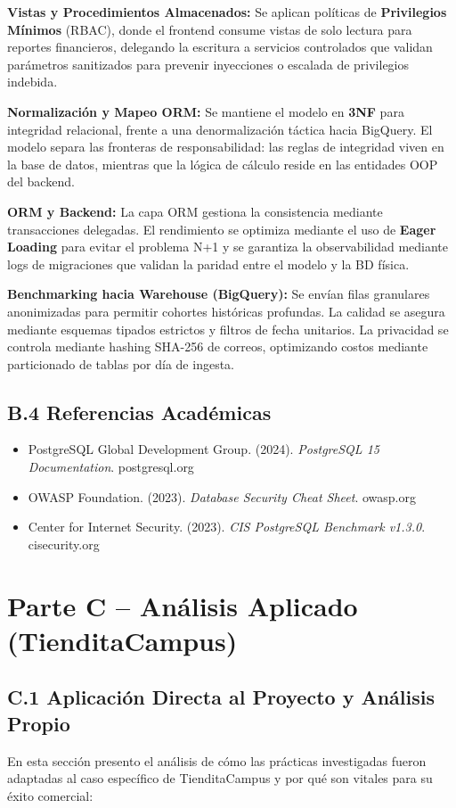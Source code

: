 \documentclass[11pt,a4paper]{article}
\begin{document}
\textbf{Vistas y Procedimientos Almacenados:} 
Se aplican políticas de \textbf{Privilegios Mínimos} (RBAC), donde el frontend consume vistas de solo lectura para reportes financieros, delegando la escritura a servicios controlados que validan parámetros sanitizados para prevenir inyecciones o escalada de privilegios indebida.

\textbf{Normalización y Mapeo ORM:} 
Se mantiene el modelo en \textbf{3NF} para integridad relacional, frente a una denormalización táctica hacia BigQuery. El modelo separa las fronteras de responsabilidad: las reglas de integridad viven en la base de datos, mientras que la lógica de cálculo reside en las entidades OOP del backend.

\textbf{ORM y Backend:} 
La capa ORM gestiona la consistencia mediante transacciones delegadas. El rendimiento se optimiza mediante el uso de \textbf{Eager Loading} para evitar el problema N+1 y se garantiza la observabilidad mediante logs de migraciones que validan la paridad entre el modelo y la BD física.

\textbf{Benchmarking hacia Warehouse (BigQuery):} 
Se envían filas granulares anonimizadas para permitir cohortes históricas profundas. La calidad se asegura mediante esquemas tipados estrictos y filtros de fecha unitarios. La privacidad se controla mediante hashing SHA-256 de correos, optimizando costos mediante particionado de tablas por día de ingesta.

\subsection{B.4 Referencias Académicas}
\begin{itemize}[itemsep=0pt]
    \item PostgreSQL Global Development Group. (2024). \textit{PostgreSQL 15 Documentation}. postgresql.org
    \item OWASP Foundation. (2023). \textit{Database Security Cheat Sheet}. owasp.org
    \item Center for Internet Security. (2023). \textit{CIS PostgreSQL Benchmark v1.3.0}. cisecurity.org
\end{itemize}

\newpage
\section{Parte C – Análisis Aplicado (TienditaCampus)}

\subsection{C.1 Aplicación Directa al Proyecto y Análisis Propio}
En esta sección presento el análisis de cómo las prácticas investigadas fueron adaptadas al caso específico de TienditaCampus y por qué son vitales para su éxito comercial:
\end{document}
